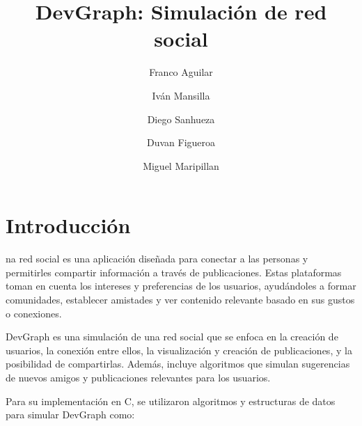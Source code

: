 \documentclass[9pt,letterpaper,onecolumn]{rho-class/rho}
\title{DevGraph: Simulación de red social}
\author[$\dagger$]{Franco Aguilar}
\author[$\dagger$]{Iván Mansilla}
\author[$\dagger$]{Diego Sanhueza}
\author[$\dagger$]{Duvan Figueroa}
\author[$\dagger$]{Miguel Maripillan}
\affil[$\dagger$]{Universidad de Magallanes}
\begin{document}
	
    \maketitle
    \thispagestyle{firststyle}
    \tableofcontents


\newpage
\section{Introducción}

na red social es una aplicación diseñada para conectar a las personas y permitirles compartir información a través de publicaciones. Estas plataformas toman en cuenta los intereses y preferencias de los usuarios, ayudándoles a formar comunidades, establecer amistades y ver contenido relevante basado en sus gustos o conexiones.

DevGraph es una simulación de una red social que se enfoca en la creación de usuarios, la conexión entre ellos, la visualización y creación de publicaciones, y la posibilidad de compartirlas. Además, incluye algoritmos que simulan sugerencias de nuevos amigos y publicaciones relevantes para los usuarios.

Para su implementación en C, se utilizaron algoritmos y estructuras de datos para simular DevGraph como:
\end{document}
